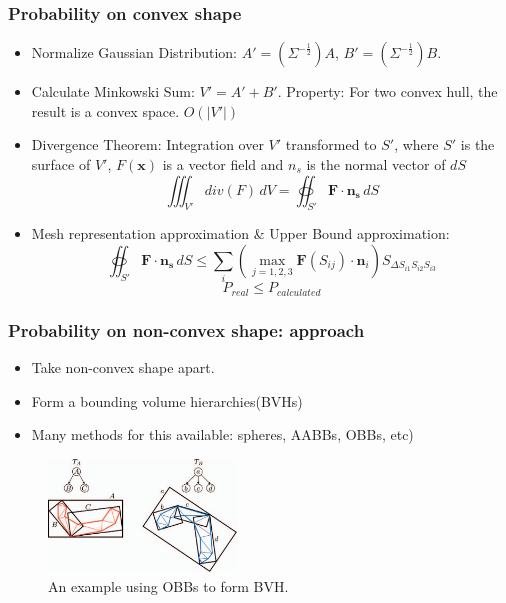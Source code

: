\documentclass{beamer}
\begin{document}
\begin{frame}
	\frametitle{Probability on convex shape}
	\begin{itemize}
		\item Normalize Gaussian Distribution: $A' = (\Sigma^{-\frac{1}{2}})A$, $B' = (\Sigma^{-\frac{1}{2}})B$.
		\item Calculate Minkowski Sum: $V' = A' + B'$. Property: For two convex hull, the result is a convex space. $O(|V'|)$
		\item Divergence Theorem: Integration over $V'$ transformed to $S'$, where $S'$ is the surface of $V'$, $F(\mathbf{x})$ is a vector field and $n_s$ is the normal vector of $dS$
		      $$\iiint_{V'}div(F)\,dV = \oiint_{S'}\mathbf{F}\cdot\mathbf{n_s}\,dS$$
		\item Mesh representation approximation \& Upper Bound approximation:
		      $$\oiint_{S'}\mathbf{F}\cdot\mathbf{n_s}\,dS \leq \sum_i(\max_{j = 1,2,3}\mathbf{F}(S_{ij})\cdot\mathbf{n}_i)S_{\Delta S_{i1}S_{i2}S_{i3}}$$
		      $$P_{real} \leq P_{calculated}$$
	\end{itemize}
\end{frame}

\begin{frame}
	\frametitle{Probability on non-convex shape: approach}
	\begin{itemize}
		\item Take non-convex shape apart.
		\item Form a bounding volume hierarchies(BVHs)
		\item Many methods for this available: spheres, AABBs, OBBs, etc)
	\end{itemize}
	\begin{figure}
		\includegraphics[width=5cm]{imgs/a.png}
		\caption{An example using OBBs to form BVH.}
	\end{figure}
\end{frame}
\end{document}
